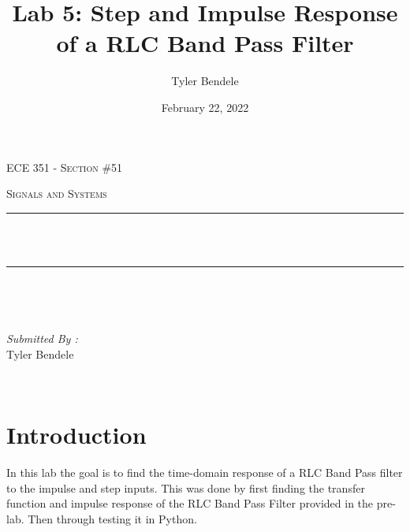 \documentclass[12pt]{report}
\title{Lab 5: Step and Impulse Response of a RLC Band Pass Filter}
\author{Tyler Bendele}
\date{February 22, 2022}
\makeatletter
\let\thetitle\@title
\makeatother
\begin{document}
\begin{titlepage}
\centering
\vspace*{0.5 cm}

\begin{center}    \textsc{\Large   ECE 351 - Section \#51 }\\[2.0 cm]
\end{center}%
\textsc{\Large Signals and Systems  }\\[0.5 cm] %

\rule{\linewidth}{0.2 mm} \\[0.4 cm]
{ \huge \bfseries \thetitle}\\
\rule{\linewidth}{0.2 mm} \\[1.5 cm]
\begin{minipage}{0.4\textwidth}
\begin{flushleft} \large
\end{flushleft}
\end{minipage}~
\begin{minipage}{0.4\textwidth}
\begin{flushright} \large
\emph{Submitted By :} \\
Tyler Bendele
\end{flushright}
\end{minipage}\\[2 cm]
\end{titlepage}
\tableofcontents
\pagebreak
\renewcommand{\thesection}{\arabic{section}}
\section{Introduction}
In this lab the goal is to find the time-domain response of a RLC Band Pass
filter to the impulse and step inputs. This was done by first finding
the transfer function and impulse response of the RLC Band Pass Filter
provided in the pre-lab. Then through testing it in Python.
\end{document}
